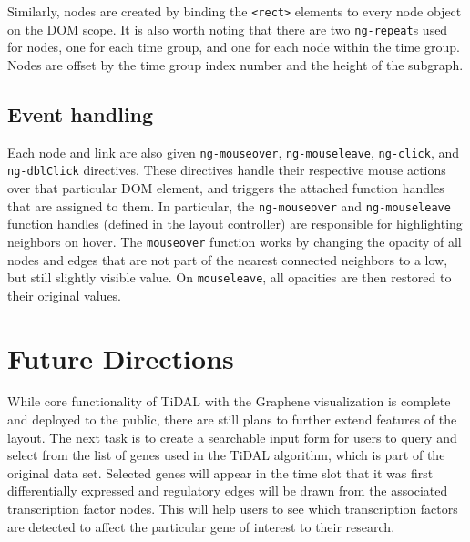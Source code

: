 Similarly, nodes are created by binding the \texttt{<rect>} elements to every node object on the DOM scope.
It is also worth noting that there are two \texttt{ng-repeat}s used for nodes, one for each time group, and one for each node within the time group.
Nodes are offset by the time group index number and the height of the subgraph.

\subsection{Event handling}
Each node and link are also given \texttt{ng-mouseover}, \texttt{ng-mouseleave}, \texttt{ng-click}, and \texttt{ng-dblClick} directives.
These directives handle their respective mouse actions over that particular DOM element, and triggers the attached function handles that are assigned to them.
In particular, the \texttt{ng-mouseover} and \texttt{ng-mouseleave} function handles (defined in the layout controller) are responsible for highlighting neighbors on hover.
The \texttt{mouseover} function works by changing the opacity of all nodes and edges that are not part of the nearest connected neighbors to a low, but still slightly visible value.
On \texttt{mouseleave}, all opacities are then restored to their original values.

\section{Future Directions}
While core functionality of TiDAL with the Graphene visualization is complete and deployed to the public, there are still plans to further extend features of the layout.
The next task is to create a searchable input form for users to query and select from the list of genes used in the TiDAL algorithm, which is part of the original data set.
Selected genes will appear in the time slot that it was first differentially expressed and regulatory edges will be drawn from the associated transcription factor nodes.
This will help users to see which transcription factors are detected to affect the particular gene of interest to their research.

